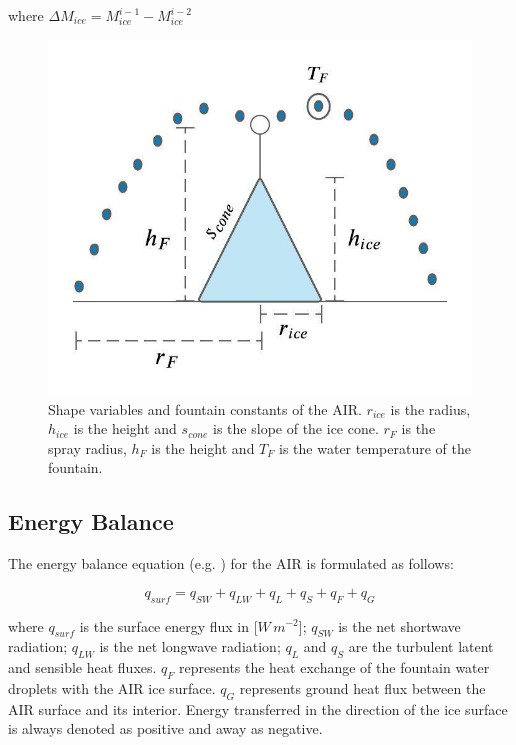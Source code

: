 \documentclass[utf8]{frontiersSCNS} %
\begin{document}
where $\Delta M_{ice} = M_{ice}^{i-1} - M_{ice}^{i-2}$

\begin{figure}
	\begin{center}
		\includegraphics[width=10
			cm]{Figures/shape_parameters.jpeg}
	\end{center}
	\caption{Shape variables and fountain constants of the AIR. $r_{ice}$ is
		the radius, $h_{ice}$ is the height and $s_{cone}$ is the slope of the ice cone. $r_F$ is the spray radius, $h_F$ is the
		height and $T_F$ is the water temperature of the fountain.}
	\label{fig:shape}
\end{figure}

\subsection{Energy Balance} \label{sec:energy}

The energy balance equation (e.g. \cite{Hock_2005}) for the AIR is formulated as follows:

\begin{equation} q_{surf} = q_{SW} + q_{LW} + q_{L} + q_{S} + q_{F} + q_{G}\label{eqn:EB} \end{equation}

where $q_{surf}$ is the surface energy flux in [$W\,m^{-2}$]; $q_{SW}$ is the net shortwave radiation; $q_{LW}$ is the
net longwave radiation; $q_{L}$ and $q_{S}$ are the turbulent latent and sensible heat fluxes. $q_{F}$ represents the
heat exchange of the fountain water droplets with the AIR ice surface. $q_{G}$ represents ground heat flux between the
AIR surface and its interior. Energy transferred in the direction of the ice surface is always denoted as positive and
away as negative.
\end{document}
